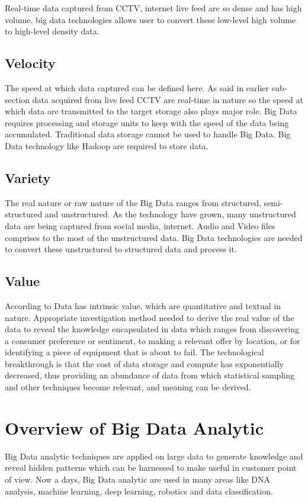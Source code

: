 \documentclass[sigconf]{acmart}
\begin{document}
Real-time data captured from CCTV, internet live feed are so dense and has high volume, big data technologies allows user to convert these low-level high volume to high-level density data.
\subsection{Velocity}
The speed at which data captured can be defined here. As said in earlier sub-section data acquired from live feed CCTV are real-time in nature so the speed at which data are transmitted to the target storage also plays major role. Big Data requires processing and storage units to keep with the speed of the data being accumulated.
Traditional data storage cannot be used to handle Big Data. Big Data technology like Hadoop are required to store data.
\subsection{Variety}
The real nature or raw nature of the Big Data ranges from structured, semi-structured and unstructured. As the technology have grown, many unstructured data are being captured from social media, internet. Audio and Video files comprises to the most of the unstructured data. Big Data technologies are needed to convert these unstructured to structured data and process it. 
\subsection{Value}
According to \cite{bigdatadef} Data has intrinsic value, which are quantitative and textual in nature. Appropriate investigation method needed to derive the real value of the data to reveal the knowledge encapsulated in data which ranges from discovering a consumer preference or sentiment, to making a relevant offer by location, or for identifying a piece of equipment that is about to fail. The technological breakthrough is that the cost of data storage and compute has exponentially decreased, thus providing an abundance of data from which statistical sampling and other techniques become relevant, and meaning can be derived.

\section{Overview of Big Data Analytic}

Big Data analytic techniques are applied on large data to generate knowledge and reveal hidden patterns which can be harnessed to make useful in customer point of view. Now a days, Big Data analytic are used in many areas like DNA analysis, machine learning, deep learning, robotics and data classification.
\end{document}
